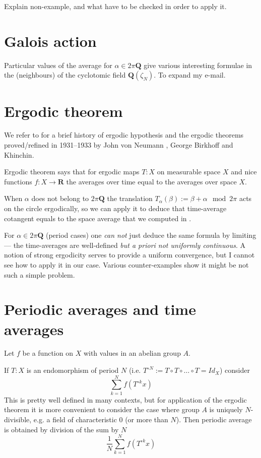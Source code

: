 \documentclass[12pt]{article}
\numberwithin{equation}{section}
\newcommand\Q{\mathbf{Q}}                    %
\newcommand\R{\mathbf{R}}                    %
\begin{document}
Explain non-example, and what have to be checked in order to apply it.

\section{Galois action}
Particular values of the average for $α\in2π\Q$ give various interesting formulae in the (neighbours)
of the cyclotomic field $\Q(ζ_N)$.
To expand my e-mail.

\section{Ergodic theorem}

We refer to \cite{Moore2015} for a brief history of ergodic hypothesis
and the ergodic theorems
proved/refined in 1931--1933
by John von Neumann \cite{Neumann1932},
George Birkhoff \cite{Birkhoff1931a,Birkhoff1931b}
and Khinchin.

Ergodic theorem says that for ergodic maps $T: X$ on measurable space $X$
and nice functions $f: X\to \R$ the averages over time equal to the averages over space $X$.

When $α$ does not belong to $2π\Q$ the translation $T_α (β) := β+α \mod 2π$ acts on the circle ergodically,
so we can apply it to deduce that time-average cotangent equals to the space average that we computed in .

For $α\in2π\Q$ (period cases) one \emph{can not} just deduce the same formula by limiting 
--- the time-averages are well-defined \emph{but a priori not uniformly continuous}.
A notion of strong ergodicity serves to provide a uniform convergence, but I cannot see how to apply it in our case.
Various counter-examples show it might be not such a simple problem.

\section{Periodic averages and time averages}

Let $f$ be a function on $X$ with values in an abelian group $A$.

If $T: X$ is an endomorphism of period $N$ (i.e. $T^{\circ N} := T\circ T\circ\dots\circ T = Id_X$) consider
\[ \sum_{k=1}^N f(T^{\circ k} x) \]
This is pretty well defined in many contexts, but for application of the ergodic theorem it is more convenient
to consider the case where group $A$ is uniquely $N$-divisible, e.g. a field of characteristic $0$ (or more than $N$).
Then periodic average is obtained by division of the sum by $N$
\[ \frac{1}{N} \sum_{k=1}^N f(T^{\circ k} x) \]
\end{document}
